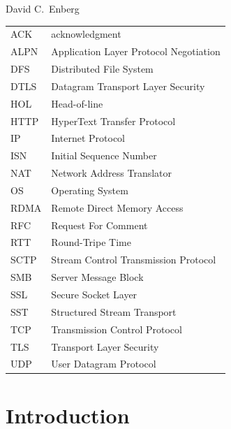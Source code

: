\documentclass[english, 12pt, a4paper, elec, utf8, a-2b, online]{aaltothesis}
\begin{document}
\vspace{5mm}
{\hfill David C.\ Enberg \hspace{1cm}}

\newpage


\thesistableofcontents



\begin{tabular}{ll}
ACK & acknowledgment \\
ALPN & Application Layer Protocol Negotiation \\
DFS & Distributed File System \\
DTLS & Datagram Transport Layer Security \\
HOL & Head-of-line \\
HTTP & HyperText Transfer Protocol \\
IP & Internet Protocol \\
ISN & Initial Sequence Number \\
NAT & Network Address Translator \\
OS & Operating System \\
RDMA & Remote Direct Memory Access \\
RFC & Request For Comment \\
RTT & Round-Tripe Time \\
SCTP & Stream Control Transmission Protocol \\
SMB & Server Message Block \\
SSL & Secure Socket Layer \\
SST & Structured Stream Transport \\
TCP & Transmission Control Protocol \\
TLS & Transport Layer Security \\
UDP & User Datagram Protocol \\
\end{tabular}


\cleardoublepage

\section{Introduction}
\label{sec:intro}

\thispagestyle{empty}
\end{document}
